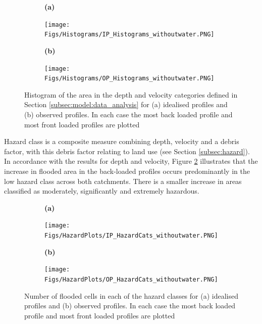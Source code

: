 \documentclass[APA,Times2COL]{WileyNJDv5}
\begin{document}
\begin{figure}[tb]
  \centering
  \begin{subfigure}[b]{\textwidth}
    \textbf{                                 (a)}
  \end{subfigure}
  \begin{subfigure}[t]{0.45\textwidth}
    \texttt{[image: Figs/Histograms/IP\_Histograms\_withoutwater.PNG]}
  \end{subfigure}\hfill
  \begin{subfigure}[t]{\textwidth}
    \textbf{                       (b)}
  \end{subfigure}
  \begin{subfigure}[t]{0.45\textwidth}
    \texttt{[image: Figs/Histograms/OP\_Histograms\_withoutwater.PNG]}
  \end{subfigure}
\caption{Histogram of the area in the depth and velocity categories defined in Section \ref{subsec:model:data_analysis} for (a) idealised profiles and (b) observed profiles. In each case the most back loaded profile and most front loaded profiles are plotted} \label{fig:histograms} 
\end{figure}

Hazard class is a composite measure combining depth, velocity and a debris factor, with this debris factor relating to land use (see Section \ref{subsec:hazard}). In accordance with the results for depth and velocity, Figure \ref{fig:hazard_plots} illustrates that the increase in flooded area in the back-loaded profiles occurs predominantly in the low hazard class across both catchments. There is a smaller increase in areas classified as moderately, significantly and extremely hazardous.

\begin{figure}[tb]
  \centering
  \begin{subfigure}[b]{\textwidth}
    \textbf{                  (a)}
  \end{subfigure}
  \begin{subfigure}[t]{0.45\textwidth}
  \texttt{[image: Figs/HazardPlots/IP\_HazardCats\_withoutwater.PNG]}
  \end{subfigure}\hfill
  \begin{subfigure}[t]{\textwidth}
    \textbf{                  (b)}
  \end{subfigure}
  \begin{subfigure}[t]{0.45\textwidth}
\texttt{[image: Figs/HazardPlots/OP\_HazardCats\_withoutwater.PNG]}
  \end{subfigure}
 \caption{Number of flooded cells in each of the hazard classes for (a) idealised profiles and (b) observed profiles. In each case the most back loaded profile and most front loaded profiles are plotted}\label{fig:hazard_plots} 
\end{figure}
\end{document}
